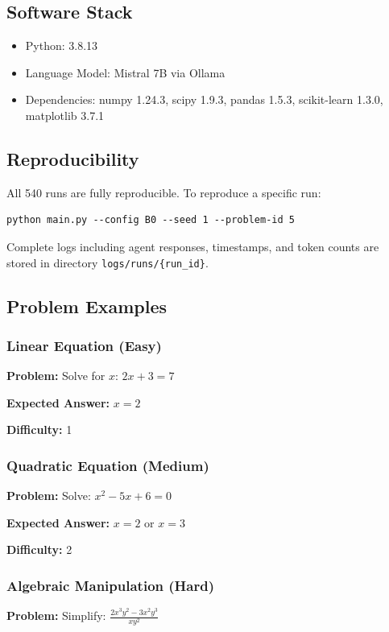 \documentclass[conference]{IEEEtran}
\begin{document}
\subsection{Software Stack}
\begin{itemize}
\item Python: 3.8.13
\item Language Model: Mistral 7B via Ollama
\item Dependencies: numpy 1.24.3, scipy 1.9.3, pandas 1.5.3, scikit-learn 1.3.0, matplotlib 3.7.1
\end{itemize}

\subsection{Reproducibility}

All 540 runs are fully reproducible. To reproduce a specific run:
\begin{verbatim}
python main.py --config B0 --seed 1 --problem-id 5
\end{verbatim}

Complete logs including agent responses, timestamps, and token counts are stored in directory \texttt{logs/runs/\{run\_id\}}.

\subsection{Problem Examples}

\subsubsection{Linear Equation (Easy)}
\textbf{Problem:} Solve for $x$: $2x + 3 = 7$

\textbf{Expected Answer:} $x = 2$

\textbf{Difficulty:} 1

\subsubsection{Quadratic Equation (Medium)}
\textbf{Problem:} Solve: $x^2 - 5x + 6 = 0$

\textbf{Expected Answer:} $x = 2$ or $x = 3$

\textbf{Difficulty:} 2

\subsubsection{Algebraic Manipulation (Hard)}
\textbf{Problem:} Simplify: $\frac{2x^3y^2 - 3x^2y^3}{xy^2}$
\end{document}
